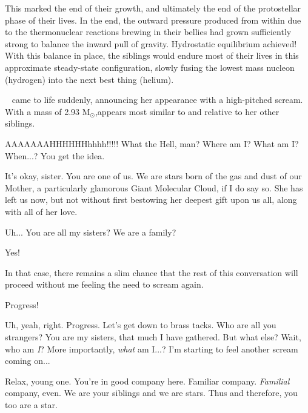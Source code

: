 \documentclass[main.tex]{subfiles}
\begin{document}
\par \nar This marked the end of their growth, and ultimately the end of the protostellar phase of their lives.  In the end, the outward pressure produced from within due to the thermonuclear reactions brewing in their bellies had grown sufficiently strong to balance the inward pull of gravity.  Hydrostatic equilibrium achieved!  With this balance in place, the siblings would endure most of their lives in this approximate steady-state configuration, slowly fusing the lowest mass nucleon (hydrogen) into the next best thing (helium).

\par \nar \rmsterope~ came to life suddenly, announcing her appearance with a high-pitched scream.  With a mass of 2.93 M$_{\odot}$,\rmsterope appears most similar to \rmtaygete and \rmalcyone relative to her other siblings.

\par \Sterope AAAAAAAHHHHHHhhhh!!!!!  What the Hell, man?  Where am I?  What am I?  When...?  You get the idea.

\par \Maia It's okay, sister.  You are one of us.  We are stars born of the gas and dust of our Mother, a particularly glamorous Giant Molecular Cloud, if I do say so.  She has left us now, but not without first bestowing her deepest gift upon us all, along with all of her love.

\par \Sterope  Uh... You are all my sisters?  We are a family?

\par \Maia Yes!

\par \Sterope  In that case, there remains a slim chance that the rest of this conversation will proceed without me feeling the need to scream again.

\par \Maia Progress!

\par \Sterope Uh, yeah, right.  Progress.  Let's get down to brass tacks.  Who are all you strangers?  You are my sisters, that much I have gathered.  But what else?  Wait, who am \textit{I}?  More importantly, \textit{what} am I...?  I'm starting to feel another scream coming on...

\par \Maia Relax, young one.  You're in good company here.  Familiar company.  \textit{Familial} company, even. We are your siblings and we are stars.  Thus and therefore, you too are a star.  
\end{document}
